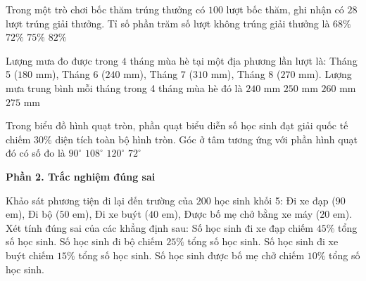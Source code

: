 \begin{ex} %
Trong một trò chơi bốc thăm trúng thưởng có $100$ lượt bốc thăm, ghi nhận có $28$ lượt trúng giải thưởng. Tỉ số phần trăm số lượt không trúng giải thưởng là
\choice
{$68\%$}
{\True $72\%$}
{$75\%$}
{$82\%$}
\end{ex}

\begin{ex} %
Lượng mưa đo được trong $4$ tháng mùa hè tại một địa phương lần lượt là: Tháng 5 ($180\text{ mm}$), Tháng 6 ($240\text{ mm}$), Tháng 7 ($310\text{ mm}$), Tháng 8 ($270\text{ mm}$). Lượng mưa trung bình mỗi tháng trong 4 tháng mùa hè đó là
\choice
{$240\text{ mm}$}
{\True $250\text{ mm}$}
{$260\text{ mm}$}
{$275\text{ mm}$}
\end{ex}

\begin{ex} %
Trong biểu đồ hình quạt tròn, phần quạt biểu diễn số học sinh đạt giải quốc tế chiếm $30\%$ diện tích toàn bộ hình tròn. Góc ở tâm tương ứng với phần hình quạt đó có số đo là
\choice
{$90^\circ$}
{\True $108^\circ$}
{$120^\circ$}
{$72^\circ$}
\end{ex}

\textbf{Phần 2. Trắc nghiệm đúng sai}

\begin{ex} %
Khảo sát phương tiện đi lại đến trường của $200$ học sinh khối 5: Đi xe đạp ($90$ em), Đi bộ ($50$ em), Đi xe buýt ($40$ em), Được bố mẹ chở bằng xe máy ($20$ em). Xét tính đúng sai của các khẳng định sau:
\choiceTF
{\True Số học sinh đi xe đạp chiếm $45\%$ tổng số học sinh.}
{\True Số học sinh đi bộ chiếm $25\%$ tổng số học sinh.}
{Số học sinh đi xe buýt chiếm $15\%$ tổng số học sinh.}
{\True Số học sinh được bố mẹ chở chiếm $10\%$ tổng số học sinh.}
\end{ex}

